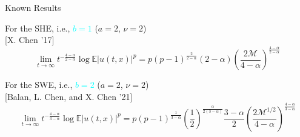 \documentclass{beamer}%
\numberwithin{equation}{section}
\newcommand{\R}{\mathbb{R}}
\begin{document}
	\begin{frame}{Known Results}%
		\begin{center}
			For the SHE, i.e., \textcolor{cyan}{$b=1$} ($a=2$, $\nu=2$)\\
			{\small [X. Chen '17]}
			\[
			\lim_{t\to \infty}t^{-\frac{4-\alpha}{2-\alpha}}\log \mathbb{E}|u(t,x)|^p =p(p-1)^{\frac{2}{2-\alpha}} (2-\alpha)\left(\frac{2\mathcal{M}}{4-\alpha}\right)^{\frac{4-\alpha}{2-\alpha}}
			\]
		\end{center}
		\vspace{.3in}
		\begin{center}
			For the SWE, i.e., \textcolor{cyan}{$b=2$} ($a=2$, $\nu=2$)\\
			{\small [Balan, L. Chen, and X. Chen '21]}
			\[
			\lim_{t \to \infty} t^{-\frac{4-\alpha}{3-\alpha}} \log \mathbb{E}|u(t,x)|^p =p(p-1)^{\frac{1}{3-\alpha}} \left(\frac{1}{2}\right)^{\frac{\alpha}{2(3-\alpha)}} \frac{3- \alpha}{2} \left( \frac{2 \mathcal{M}^{1/2}}{4-\alpha} \right)^{\frac{4-\alpha}{3-\alpha}}
			\]
		\end{center}
		
	\end{frame}%
	
\end{document}
